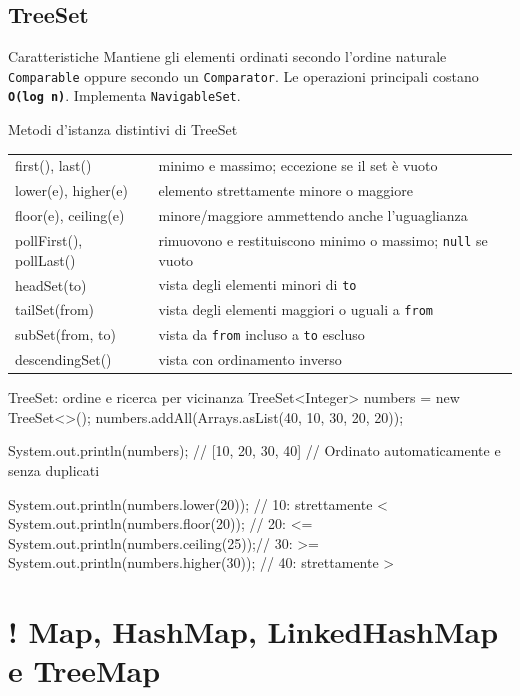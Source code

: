﻿\documentclass[10pt,a4paper]{article}
\newcommand{\cmd}[1]{\texttt{#1}}
\newcommand{\complexity}[1]{\textcolor{accent}{\texttt{\textbf{#1}}}}
\DeclareRobustCommand{\exammark}{%
  \texorpdfstring{\textcolor{examred}{\bfseries\Large !}\hspace{.18em}}{! }%
}
\newcommand{\topicsection}[1]{\Needspace{12\baselineskip}\section{#1}}
\newcommand{\topicsubsection}[1]{\Needspace{10\baselineskip}\subsection{#1}}
\newenvironment{topicblock}{%
  \par\medskip\noindent\begin{minipage}{\textwidth}%
}{%
  \end{minipage}\par\medskip%
}
\begin{document}
\begin{topicblock}
\topicsubsection{TreeSet}
\begin{difference}{Caratteristiche}
Mantiene gli elementi ordinati secondo l'ordine naturale
\cmd{Comparable} oppure secondo un \cmd{Comparator}. Le operazioni
principali costano \complexity{O(log n)}. Implementa \cmd{NavigableSet}.
\end{difference}

\begin{concept}{Metodi d'istanza distintivi di TreeSet}
\begin{tabularx}{\textwidth}{>{\ttfamily\small}p{4cm} X}
first(), last() & minimo e massimo; eccezione se il set è vuoto \\
lower(e), higher(e) & elemento strettamente minore o maggiore \\
floor(e), ceiling(e) & minore/maggiore ammettendo anche l'uguaglianza \\
pollFirst(), pollLast() & rimuovono e restituiscono minimo o massimo; \cmd{null} se vuoto \\
headSet(to) & vista degli elementi minori di \cmd{to} \\
tailSet(from) & vista degli elementi maggiori o uguali a \cmd{from} \\
subSet(from, to) & vista da \cmd{from} incluso a \cmd{to} escluso \\
descendingSet() & vista con ordinamento inverso \\
\end{tabularx}
\end{concept}

\begin{codebox}{TreeSet: ordine e ricerca per vicinanza}
TreeSet<Integer> numbers = new TreeSet<>();
numbers.addAll(Arrays.asList(40, 10, 30, 20, 20));

System.out.println(numbers);     // [10, 20, 30, 40]
// Ordinato automaticamente e senza duplicati

System.out.println(numbers.lower(20));  // 10: strettamente <
System.out.println(numbers.floor(20));  // 20: <=
System.out.println(numbers.ceiling(25));// 30: >=
System.out.println(numbers.higher(30)); // 40: strettamente >
\end{codebox}

\end{topicblock}
\topicsection{\exammark Map, HashMap, LinkedHashMap e TreeMap}
\end{document}
